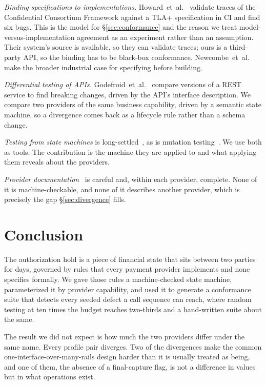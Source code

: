 \documentclass[conference]{IEEEtran}
\begin{document}
\emph{Binding specifications to implementations.} Howard~et~al.~\cite{howard2025ccf}
validate traces of the Confidential Consortium Framework against a TLA+
specification in CI and find six bugs. This is the model for
\S\ref{sec:conformance} and the reason we treat model-versus-implementation
agreement as an experiment rather than an assumption. Their system's source is
available, so they can validate traces; ours is a third-party API, so the binding
has to be black-box conformance. Newcombe~et~al.~\cite{newcombe2014amazon} make
the broader industrial case for specifying before building.

\emph{Differential testing of APIs.} Godefroid~et~al.~\cite{godefroid2020differential}
compare versions of a REST service to find breaking changes, driven by the API's
interface description. We compare two providers of the same business capability,
driven by a semantic state machine, so a divergence comes back as a lifecycle
rule rather than a schema change.

\emph{Testing from state machines} is long-settled~\cite{chow1978testing,
lee1996principles}, as is mutation testing~\cite{demillo1978hints,
jia2011analysis}. We use both as tools. The contribution is the machine they are
applied to and what applying them reveals about the providers.

\emph{Provider documentation}~\cite{stripe2026hold, stripe2026multicapture,
stripe2026overcapture, adyen2026capture, adyen2026adjust} is careful and, within
each provider, complete. None of it is machine-checkable, and none of it
describes another provider, which is precisely the gap
\S\ref{sec:divergence} fills.

\section{Conclusion}

The authorization hold is a piece of financial state that sits between two
parties for days, governed by rules that every payment provider implements and
none specifies formally. We gave those rules a machine-checked state machine,
parameterized it by provider capability, and used it to generate a conformance
suite that detects every seeded defect a call sequence can reach, where random
testing at ten times the budget reaches two-thirds and a hand-written suite about
the same.

The result we did not expect is how much the two providers differ under the same
name. Every profile pair diverges. Two of the divergences make the common
one-interface-over-many-rails design harder than it is usually treated as being,
and one of them, the absence of a final-capture flag, is not a difference in
values but in what operations exist.
\end{document}
